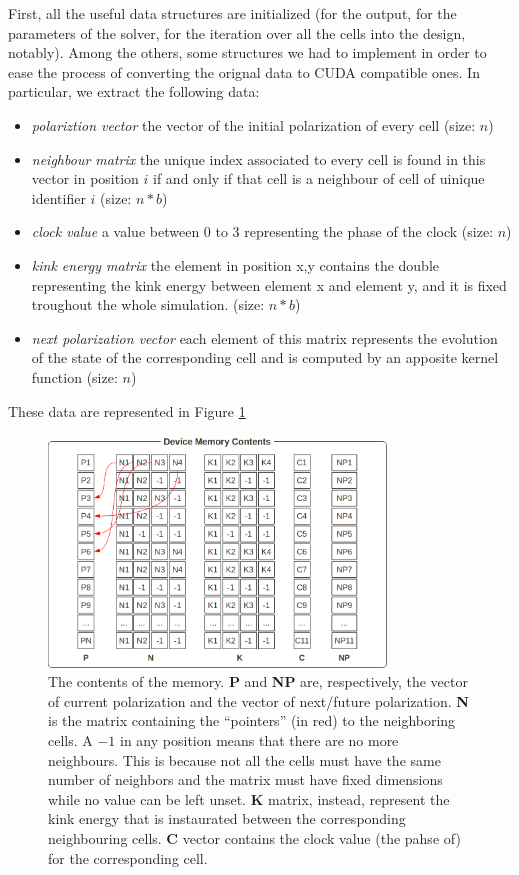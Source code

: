 First, all the useful data structures are initialized (for the output, for the parameters of the solver, for the iteration over all the cells into the design, notably). Among the others, some structures we had to implement in order to ease the process of converting the orignal data to CUDA compatible ones. In particular, we extract the following data:
\begin{itemize}
\item \textsl{polariztion vector} the vector of the initial polarization of every cell  (size: $n$)
\item \textsl{neighbour matrix} the unique index associated to every cell is found in this vector in position $i$ if and only if that cell is a neighbour of cell of uinique identifier $i$  (size: $n*b$)
\item \textsl{clock value} a value between 0 to 3 representing the phase of the clock (size: $n$)
\item \textsl{kink energy matrix} the element in position x,y contains the double representing the kink energy between element x and element y, and it is fixed troughout the whole simulation. (size: $n*b$)
\item \textsl{next polarization vector} each element of this matrix represents the evolution of the state of the corresponding cell and is computed by an apposite kernel function (size: $n$)
\end{itemize}
These data are represented in Figure \ref{fig:impdetmem}

\begin{figure}[h!bt]
	\centerline{\includegraphics[width=0.8\textwidth]{img/impdetmem.png}}
	\caption{The contents of the memory. \textbf{P} and \textbf{NP} are, respectively, the vector of current polarization and the vector of next/future polarization. \textbf{N} is the matrix containing the ``pointers'' (in red) to the neighboring cells. A $-1$ in any position means that there are no more neighbours. This is because not all the cells must have the same number of neighbors and the matrix must have fixed dimensions while no value can be left unset. \textbf{K} matrix, instead, represent the kink energy that is instaurated between the corresponding neighbouring cells. \textbf{C} vector contains the clock value (the pahse of) for the corresponding cell.}
	\label{fig:impdetmem}
\end{figure}

